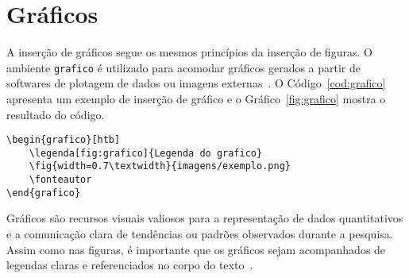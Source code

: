 \documentclass[
    12pt
    ,oneside
    ,a4paper
    ,chapter=TITLE
    ,section=TITLE
    ,sumario=abnt-6027-2012]{abntex2}
\begin{document}
\begin{figure}[htb]
    \hfil
    \hfil

    \hfil
    \hfil
\end{figure}

\section{Gráficos}

A inserção de gráficos segue os mesmos princípios da inserção de figuras. O ambiente \texttt{grafico} é utilizado para acomodar gráficos gerados a partir de softwares de plotagem de dados ou imagens externas~\cite{mittelbach2004latex}. O Código~\ref{cod:grafico} apresenta um exemplo de inserção de gráfico e o Gráfico~\ref{fig:grafico} mostra o resultado do código.

\begin{codigo}[htb]
\begin{lstlisting}
\begin{grafico}[htb]
    \legenda[fig:grafico]{Legenda do grafico}
    \fig{width=0.7\textwidth}{imagens/exemplo.png}
    \fonteautor
\end{grafico}
\end{lstlisting}
\fonteautor
\end{codigo}

\begin{grafico}[htb]
\end{grafico}

Gráficos são recursos visuais valiosos para a representação de dados quantitativos e a comunicação clara de tendências ou padrões observados durante a pesquisa. Assim como nas figuras, é importante que os gráficos sejam acompanhados de legendas claras e referenciados no corpo do texto~\cite{tufte1990envisioning}.
\end{document}
